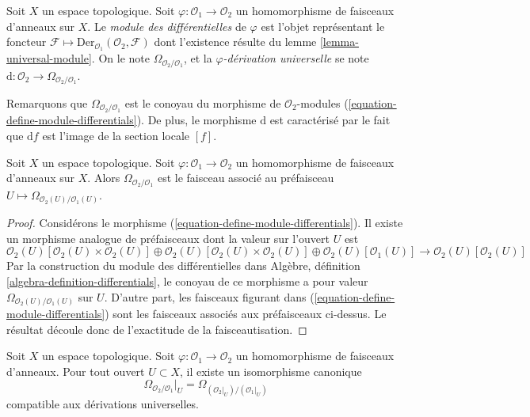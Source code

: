 \begin{definition}
\label{definition-module-differentials}
Soit $X$ un espace topologique. Soit
$\varphi : \mathcal{O}_1 \to \mathcal{O}_2$ un homomorphisme de faisceaux
d'anneaux sur $X$. Le {\it module des différentielles} de $\varphi$ est
l'objet représentant le foncteur
$\mathcal{F} \mapsto \text{Der}_{\mathcal{O}_1}(\mathcal{O}_2, \mathcal{F})$
dont l'existence résulte du lemme \ref{lemma-universal-module}.
On le note $\Omega_{\mathcal{O}_2/\mathcal{O}_1}$, et la
{\it $\varphi$-dérivation universelle} se note
$\text{d} : \mathcal{O}_2 \to \Omega_{\mathcal{O}_2/\mathcal{O}_1}$.
\end{definition}

\noindent
Remarquons que $\Omega_{\mathcal{O}_2/\mathcal{O}_1}$ est le conoyau du
morphisme de $\mathcal{O}_2$-modules
(\ref{equation-define-module-differentials}). De plus, le morphisme
$\text{d}$ est caractérisé par le fait que $\text{d}f$ est l'image de la
section locale $[f]$.

\begin{lemma}
\label{lemma-differentials-sheafify}
Soit $X$ un espace topologique. Soit
$\varphi : \mathcal{O}_1 \to \mathcal{O}_2$ un homomorphisme de faisceaux
d'anneaux sur $X$. Alors $\Omega_{\mathcal{O}_2/\mathcal{O}_1}$ est le
faisceau associé au préfaisceau
$U \mapsto \Omega_{\mathcal{O}_2(U)/\mathcal{O}_1(U)}$.
\end{lemma}

\begin{proof}
Considérons le morphisme (\ref{equation-define-module-differentials}). Il
existe un morphisme analogue de préfaisceaux dont la valeur sur l'ouvert
$U$ est
$$
\mathcal{O}_2(U)[\mathcal{O}_2(U) \times \mathcal{O}_2(U)] \oplus
\mathcal{O}_2(U)[\mathcal{O}_2(U) \times \mathcal{O}_2(U)] \oplus
\mathcal{O}_2(U)[\mathcal{O}_1(U)]
\longrightarrow
\mathcal{O}_2(U)[\mathcal{O}_2(U)]
$$
Par la construction du module des différentielles dans Algèbre, définition
\ref{algebra-definition-differentials}, le conoyau de ce morphisme a pour
valeur $\Omega_{\mathcal{O}_2(U)/\mathcal{O}_1(U)}$ sur $U$. D'autre part,
les faisceaux figurant dans (\ref{equation-define-module-differentials}) sont
les faisceaux associés aux préfaisceaux ci-dessus. Le résultat découle donc
de l'exactitude de la faisceautisation.
\end{proof}

\begin{lemma}
\label{lemma-localize-differentials}
Soit $X$ un espace topologique. Soit
$\varphi : \mathcal{O}_1 \to \mathcal{O}_2$ un homomorphisme de faisceaux
d'anneaux. Pour tout ouvert $U \subset X$, il existe un isomorphisme canonique
$$
\Omega_{\mathcal{O}_2/\mathcal{O}_1}|_U =
\Omega_{(\mathcal{O}_2|_U)/(\mathcal{O}_1|_U)}
$$
compatible aux dérivations universelles.
\end{lemma}

